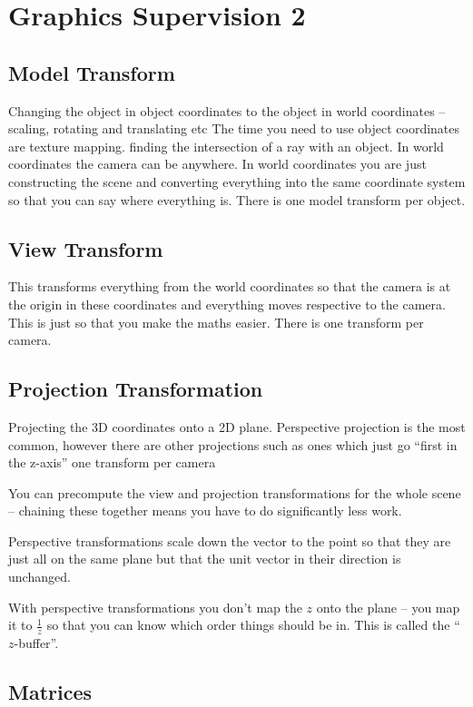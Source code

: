 \documentclass[10pt, a4paper]{article}
\begin{document}
\section*{Graphics Supervision 2}

\subsection*{Model Transform}
Changing the object in object coordinates to the object in world
coordinates -- scaling, rotating and translating etc
The time you need to use object coordinates are texture mapping.
finding the intersection of a ray with an object.
In world coordinates the camera can be anywhere.
In world coordinates you are just constructing the scene and
converting everything into the same coordinate system so that you can say where everything is.
There is one model transform per object.

\subsection*{View Transform}
This transforms everything from the world coordinates so that the
camera is at the origin in these coordinates and everything moves respective to the camera.
This is just so that you make the maths easier.
There is one transform per camera.

\subsection*{Projection Transformation}
Projecting the 3D coordinates onto a 2D plane.
Perspective projection is the most common, however there are other
projections such as ones which just go ``first in the z-axis''
one transform per camera

You can precompute the view and projection transformations for the whole scene -- chaining
these together means you have to do significantly less work.

Perspective transformations scale down the vector to the point so that
they are just all on the same plane but that the unit vector in their direction is unchanged.

With perspective transformations you don't map the $z$ onto the plane --
you map it to $\frac{1}{z}$ so that you can know which order things should be in. This is
called the ``$z$-buffer''.

\subsection*{Matrices}
\end{document}
